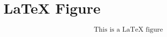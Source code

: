 \documentclass{article}%
\begin{document}
%
\normalsize%
\section{LaTeX Figure}%
\label{sec:LaTeXFigure}%
\[%
\text{This is a LaTeX figure}%
\]

%
\end{document}
